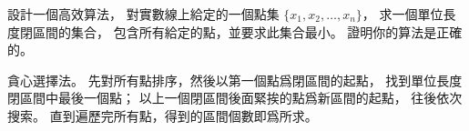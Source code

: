\startEXERCISE
設計一個高效算法，
對實數線上給定的一個點集 $\{x_1,x_2,\ldots,x_n\}$，
求一個單位長度閉區間的集合，
包含所有給定的點，並要求此集合最小。
證明你的算法是正確的。
\stopEXERCISE

\startANSWER
貪心選擇法。
先對所有點排序，然後以第一個點爲閉區間的起點，
找到單位長度閉區間中最後一個點；
以上一個閉區間後面緊挨的點爲新區間的起點，
往後依次搜索。
直到遍歷完所有點，得到的區間個數即爲所求。
\stopANSWER

